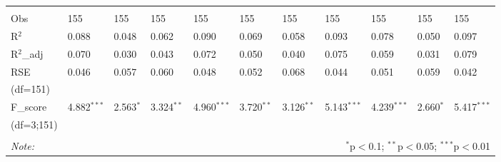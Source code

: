 \begin{table}[H]
\begin{tabularx}{\textwidth}{XXXXXXXXXXl}
\hline \\[-1.8ex] 
Obs & 155 & 155 & 155 & 155 & 155 & 155 & 155 & 155 & 155 & 155 \\ 
R$^{2}$ & 0.088 & 0.048 & 0.062 & 0.090 & 0.069 & 0.058 & 0.093 & 0.078 & 0.050 & 0.097 \\ 
R$^{2}$_{adj} & 0.070 & 0.030 & 0.043 & 0.072 & 0.050 & 0.040 & 0.075 & 0.059 & 0.031 & 0.079 \\ 
RSE & 0.046 & 0.057 & 0.060 & 0.048 & 0.052 & 0.068 & 0.044 & 0.051 & 0.059 & 0.042 \\ 
(df=151) & & & & & & & & & & \\
F_{score} & 4.882$^{***}$ & 2.563$^{*}$ & 3.324$^{**}$ & 4.960$^{***}$ & 3.720$^{**}$ & 3.126$^{**}$ & 5.143$^{***}$ & 4.239$^{***}$ & 2.660$^{*}$ & 5.417$^{***}$ \\ 
(df=3;151) & & & & & & & & & & \\
\hline 
\hline \\[-1.8ex] 
\textit{Note:}  & \multicolumn{10}{r}{$^{*}$p$<$0.1; $^{**}$p$<$0.05; $^{***}$p$<$0.01} \\ 
\end{tabularx} 
\end{table}








